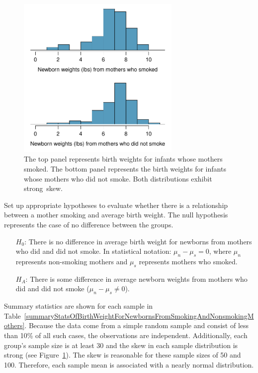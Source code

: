 \begin{figure}
\centering
\includegraphics[width=0.7\textwidth]{05/figures/babySmokePlotOfTwoGroupsToExamineSkew/babySmokePlotOfTwoGroupsToExamineSkew}
\caption{The top panel represents birth weights for infants whose mothers smoked. The bottom panel represents the birth weights for infants whose mothers who did not smoke. Both distributions exhibit strong~skew.}
\label{babySmokePlotOfTwoGroupsToExamineSkew}
\end{figure}

\textB{\pagebreak}

\begin{example}{Set up appropriate hypotheses to evaluate whether there is a relationship between a mother smoking and average birth weight.}\label{babySmokeHTForWeight}
The null hypothesis represents the case of no difference between the groups.
\begin{itemize}
\setlength{\itemsep}{0mm}
\item[$H_0$:] There is no difference in average birth weight for newborns from mothers who did and did not smoke. In statistical notation: $\mu_{n} - \mu_{s} = 0$, where $\mu_{n}$ represents non-smoking mothers and $\mu_s$ represents mothers who smoked.
\item[$H_A$:] There is some difference in average newborn weights from mothers who did and did not smoke ($\mu_{n} - \mu_{s} \neq 0$).
\end{itemize}
\end{example}

Summary statistics are shown for each sample in Table~\ref{summaryStatsOfBirthWeightForNewbornsFromSmokingAndNonsmokingMothers}. Because the data come from a simple random sample and consist of less than 10\% of all such cases, the observations are independent. Additionally, each group's sample size is at least 30 and the skew in each sample distribution is strong (see Figure~\ref{babySmokePlotOfTwoGroupsToExamineSkew}). The skew is reasonable for these sample sizes of 50 and 100. Therefore, each sample mean is associated with a nearly normal distribution.

